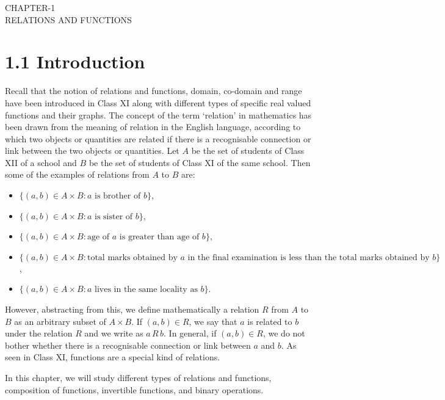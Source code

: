 \documentclass[12pt]{article}
\begin{document}
\begin{center}
\textbf\large{CHAPTER-1 \\ RELATIONS AND FUNCTIONS}
\end{center}

\section*{1.1 Introduction}

Recall that the notion of relations and functions, domain, co-domain and range have been introduced in Class XI along with different types of specific real valued functions and their graphs. The concept of the term `relation' in mathematics has been drawn from the meaning of relation in the English language, according to which two objects or quantities are related if there is a recognisable connection or link between the two objects or quantities. Let \( A \) be the set of students of Class XII of a school and \( B \) be the set of students of Class XI of the same school. Then some of the examples of relations from \( A \) to \( B \) are:
\begin{itemize}
    \item \( \{(a, b) \in A \times B : a \text{ is brother of } b\} \),
    \item \( \{(a, b) \in A \times B : a \text{ is sister of } b\} \),
    \item \( \{(a, b) \in A \times B : \text{age of } a \text{ is greater than age of } b\} \),
    \item \( \{(a, b) \in A \times B : \text{total marks obtained by } a \text{ in the final examination is less than the total marks obtained by } b\} \),
    \item \( \{(a, b) \in A \times B : a \text{ lives in the same locality as } b\} \).
\end{itemize}

However, abstracting from this, we define mathematically a relation \( R \) from \( A \) to \( B \) as an arbitrary subset of \( A \times B \). If \( (a, b) \in R \), we say that \( a \) is related to \( b \) under the relation \( R \) and we write as \( a \, R \, b \). In general, if \( (a, b) \in R \), we do not bother whether there is a recognisable connection or link between \( a \) and \( b \). As seen in Class XI, functions are a special kind of relations.

In this chapter, we will study different types of relations and functions, composition of functions, invertible functions, and binary operations.
\end{document}
